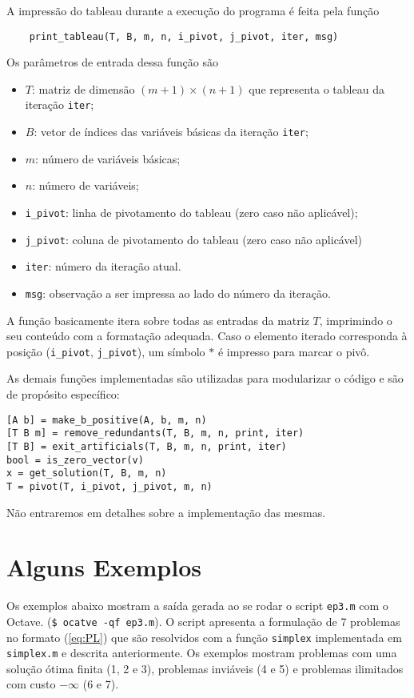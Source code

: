 \documentclass[12pt,a4paper]{article}
\newcommand{\zerar}{\setcounter{equation}{0}\setcounter{figure}{0}\setcounter{table}{0}}
\begin{document}
A impressão do tableau durante a execução do programa é feita pela função
%
\begin{verbatim}
	print_tableau(T, B, m, n, i_pivot, j_pivot, iter, msg)
\end{verbatim}
%
Os parâmetros de entrada dessa função são
%
\begin{itemize}
	\item $T$: matriz de dimensão $(m+1) \times (n+1)$ que representa o tableau da iteração 
	\verb|iter|;
	\item $B$: vetor de índices das variáveis básicas da iteração \verb|iter|;
	\item $m$: número de variáveis básicas;
	\item $n$: número de variáveis;
	\item \verb|i_pivot|: linha de pivotamento do tableau (zero caso não aplicável);
	\item \verb|j_pivot|: coluna de pivotamento do tableau (zero caso não aplicável)
	\item \verb|iter|: número da iteração atual.
	\item \verb|msg|: observação a ser impressa ao lado do número da iteração.
\end{itemize} 
%
A função basicamente itera sobre todas as entradas da matriz $T$, imprimindo o seu conteúdo com
a formatação adequada. Caso o elemento iterado corresponda à posição (\verb|i_pivot|, 
\verb|j_pivot|), um símbolo $\ast$ é impresso para marcar o pivô.


As demais funções implementadas são utilizadas para modularizar o código e são de propósito 
específico:
%
\begin{verbatim}
[A b] = make_b_positive(A, b, m, n)
[T B m] = remove_redundants(T, B, m, n, print, iter)
[T B] = exit_artificials(T, B, m, n, print, iter)
bool = is_zero_vector(v)
x = get_solution(T, B, m, n)
T = pivot(T, i_pivot, j_pivot, m, n)
\end{verbatim}
%
Não entraremos em detalhes sobre a implementação das mesmas.


\zerar
\section{Alguns Exemplos}
\label{sec:exemplos}

Os exemplos abaixo mostram a saída gerada ao se rodar o script \verb|ep3.m| com o Octave.
(\verb|$ ocatve -qf ep3.m|). O script apresenta a formulação de 7 problemas no formato 
(\ref{eq:PL}) que são resolvidos com a função \verb|simplex| implementada em \verb|simplex.m| e
descrita anteriormente. Os exemplos mostram problemas com uma solução ótima finita (1, 2 e 3),
problemas inviáveis (4 e 5) e problemas ilimitados com custo $-\infty$ (6 e 7).
\end{document}
